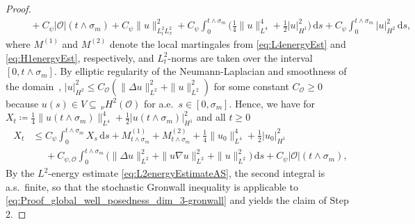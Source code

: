 \documentclass[reqno]{amsart}
\newcommand{\sO}{\mathscr{O}}
\newcommand{\ce}{\coloneqq}
\newcommand{\seq}{\subseteq}
\newcommand{\1}{\mathbf{1}}
\newcommand{\grad}{\nabla}
\newcommand{\ds}{\,\mathrm{d}s}
\newcommand{\inttm}{\int_0^{t\wedge\sigma_m}}
\newcommand{\nH}{\ensuremath{\,_\nu H}}
\begin{document}
\begin{proof}
\begin{align*}
         &\phantom{\le }+C_\psi|\sO|(t\land \sigma_m)+ C_\psi \|u\|_{L_t^2L_x^2}^2+ C_\psi \inttm \Big(\frac{1}{4}\|u\|_{L^4}^4+\frac{1}{2}|u|_{H^1}^2\Big)  \ds  + C_\psi \inttm    |u|_{H^2}^2 \ds,
    \end{align*}
    where $M^{(1)}$ and $M^{(2)}$ denote the local martingales from \eqref{eq:L4energyEst} and \eqref{eq:H1energyEst}, respectively, and $L_t^2$-norms are taken over the interval $[0,t\land \sigma_m]$. By elliptic regularity of the Neumann-Laplacian and smoothness of the domain~\cite[Cor.~2.2.2.6]{grisvardEllipticProblemsNonsmooth2011}, $|u|_{H^2}^2\le C_\sO(\|\Delta u\|_{L^2}^2+\|u\|_{L^2}^2)$ for some constant $C_\sO\ge 0$ because $u(s)\in V\seq \nH^2(\sO)$ for a.e.\ $s\in [0,\sigma_m]$.  Hence, we have for $ X_t \ce \frac{1}{4} \|u(t\land \sigma_m)\|_{L^4}^4 + \frac{1}{2}|u(t \land \sigma_m)|^2_{H^1}$ and all $t\geq 0$
    \begin{equation}\label{eq:Proof_global_well_posedness_dim_3-gronwall}
    \begin{aligned}
       X_t  & \le  C_\psi \inttm X_s  \ds  + M^{(1)}_{t\land \sigma_m} + M^{(2)}_{t\land\sigma_m}  +  \frac{1}{4}\|u_0\|_{L^4}^4 + \frac{1}{2}|u_0|^2_{H^1} \\
       &\phantom{\le } + C_{\psi, \sO}\int_0^{t\wedge\sigma_m} \big( \|\Delta u\|^2_{L^2} +\|u\grad u\|^2_{L^2} + \|u\|^2_{L^2}\big)\ds + C_\psi|\sO|(t\land \sigma_m),
    \end{aligned}
    \end{equation}
    By the $L^2$-energy estimate \eqref{eq:L2energyEstimateAS}, the second integral is a.s.\ finite, so that the stochastic Gronwall inequality is applicable to \eqref{eq:Proof_global_well_posedness_dim_3-gronwall} and yields the claim of Step 2.


\end{proof}
\end{document}
